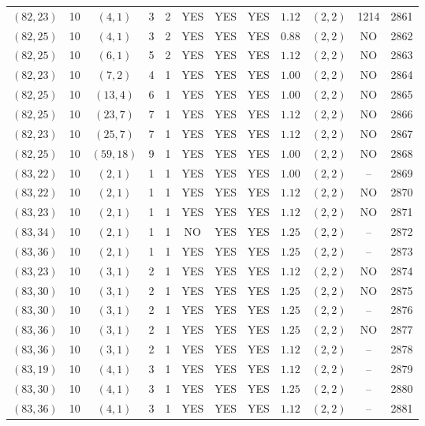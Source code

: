 \begin{longtable}{|c|c|c|c|c|c|c|c|c|c|c|c|}
$(82,23)$ & 10 & $(4,1)$ & 3 & 2 & YES & YES & YES & $1.12$ & $(2,2)$ & 1214 & 2861\\
$(82,25)$ & 10 & $(4,1)$ & 3 & 2 & YES & YES & YES & $0.88$ & $(2,2)$ & NO & 2862\\
$(82,25)$ & 10 & $(6,1)$ & 5 & 2 & YES & YES & YES & $1.12$ & $(2,2)$ & NO & 2863\\
$(82,23)$ & 10 & $(7,2)$ & 4 & 1 & YES & YES & YES & $1.00$ & $(2,2)$ & NO & 2864\\
$(82,25)$ & 10 & $(13,4)$ & 6 & 1 & YES & YES & YES & $1.00$ & $(2,2)$ & NO & 2865\\
$(82,25)$ & 10 & $(23,7)$ & 7 & 1 & YES & YES & YES & $1.12$ & $(2,2)$ & NO & 2866\\
$(82,23)$ & 10 & $(25,7)$ & 7 & 1 & YES & YES & YES & $1.12$ & $(2,2)$ & NO & 2867\\
$(82,25)$ & 10 & $(59,18)$ & 9 & 1 & YES & YES & YES & $1.00$ & $(2,2)$ & NO & 2868\\
$(83,22)$ & 10 & $(2,1)$ & 1 & 1 & YES & YES & YES & $1.00$ & $(2,2)$ & -- & 2869\\
$(83,22)$ & 10 & $(2,1)$ & 1 & 1 & YES & YES & YES & $1.12$ & $(2,2)$ & NO & 2870\\
$(83,23)$ & 10 & $(2,1)$ & 1 & 1 & YES & YES & YES & $1.12$ & $(2,2)$ & NO & 2871\\
$(83,34)$ & 10 & $(2,1)$ & 1 & 1 & NO & YES & YES & $1.25$ & $(2,2)$ & -- & 2872\\
$(83,36)$ & 10 & $(2,1)$ & 1 & 1 & YES & YES & YES & $1.25$ & $(2,2)$ & -- & 2873\\
$(83,23)$ & 10 & $(3,1)$ & 2 & 1 & YES & YES & YES & $1.12$ & $(2,2)$ & NO & 2874\\
$(83,30)$ & 10 & $(3,1)$ & 2 & 1 & YES & YES & YES & $1.25$ & $(2,2)$ & NO & 2875\\
$(83,30)$ & 10 & $(3,1)$ & 2 & 1 & YES & YES & YES & $1.25$ & $(2,2)$ & -- & 2876\\
$(83,36)$ & 10 & $(3,1)$ & 2 & 1 & YES & YES & YES & $1.25$ & $(2,2)$ & NO & 2877\\
$(83,36)$ & 10 & $(3,1)$ & 2 & 1 & YES & YES & YES & $1.12$ & $(2,2)$ & -- & 2878\\
$(83,19)$ & 10 & $(4,1)$ & 3 & 1 & YES & YES & YES & $1.12$ & $(2,2)$ & -- & 2879\\
$(83,30)$ & 10 & $(4,1)$ & 3 & 1 & YES & YES & YES & $1.25$ & $(2,2)$ & -- & 2880\\
$(83,36)$ & 10 & $(4,1)$ & 3 & 1 & YES & YES & YES & $1.12$ & $(2,2)$ & -- & 2881\\

\end{longtable}
